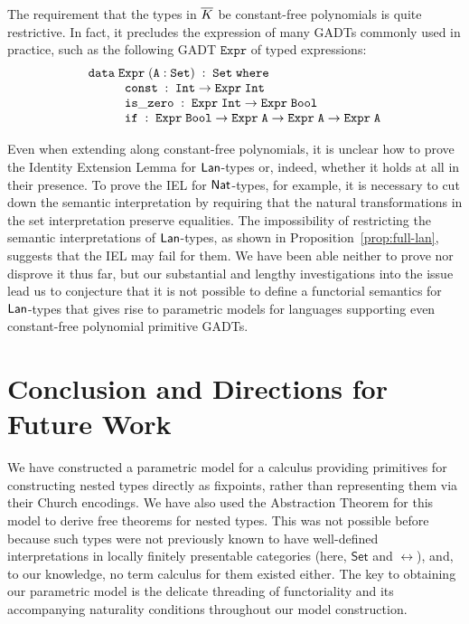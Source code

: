 \documentclass{lmcs}
\theoremstyle{plain}\newtheorem{satz}[thm]{Satz}
\newcommand{\set}{\mathsf{Set}}
\begin{document}
The requirement that the types in $\overline{K}$ be constant-free
polynomials is quite restrictive. In fact, it precludes the expression
of many GADTs commonly used in practice, such as the following GADT
$\mathtt{Expr}$ of typed expressions:
\[
\begin{array}{l}
\mathtt{data\; Expr \;(A : Set)\;:\;Set\;where}\\
\hspace*{0.4in}\mathtt{const\;:\; Int \to Expr\; Int}\\
\hspace*{0.4in}\mathtt{is\_zero\;:\; Expr\; Int \rightarrow Expr\; Bool}\\
\hspace*{0.4in}\mathtt{if\;:\; Expr\; Bool \to Expr\; A \to Expr\; A \to Expr\; A}
\end{array}
\]

Even when extending along constant-free polynomials, it is unclear how
to prove the Identity Extension Lemma for $\mathsf{Lan}$-types or, indeed,
whether it holds at all in their presence. To prove the IEL for
$\mathsf{Nat}$-types, for example, it is necessary to cut down the semantic
interpretation by requiring that the natural transformations in the
set interpretation preserve equalities. The impossibility of
restricting the semantic interpretations of $\mathsf{Lan}$-types, as shown in
Proposition~\ref{prop:full-lan}, suggests that the IEL may fail for
them. We have been able neither to prove nor disprove it thus far, but
our substantial and lengthy investigations into the issue lead us to
conjecture that it is not possible to define a functorial semantics
for $\mathsf{Lan}$-types that gives rise to parametric models for languages
supporting even constant-free polynomial primitive GADTs.

\section{Conclusion and Directions for Future Work}\label{sec:conclusion}

We have constructed a parametric model for a calculus providing
primitives for constructing nested types directly as fixpoints, rather
than representing them via their Church encodings. We have also used
the Abstraction Theorem for this model to derive free theorems for
nested types. This was not possible before~\cite{jp19} because such
types were not previously known to have well-defined interpretations
in locally finitely presentable categories (here, $\set$ and $\rel$),
and, to our knowledge, no term calculus for them existed either. The
key to obtaining our parametric model is the delicate threading of
functoriality and its accompanying naturality conditions throughout
our model construction.
\end{document}
